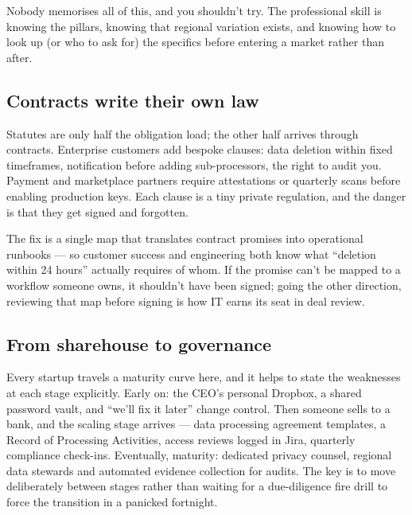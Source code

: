 Nobody memorises all of this, and you shouldn't try. The professional skill is knowing the pillars, knowing that regional variation exists, and knowing how to look up (or who to ask for) the specifics before entering a market rather than after.



\subsection{Contracts write their own law}


Statutes are only half the obligation load; the other half arrives through contracts. Enterprise customers add bespoke clauses: data deletion within fixed timeframes, notification before adding sub-processors, the right to audit you. Payment and marketplace partners require attestations or quarterly scans before enabling production keys. Each clause is a tiny private regulation, and the danger is that they get signed and forgotten.


The fix is a single map that translates contract promises into operational runbooks — so customer success and engineering both know what ``deletion within 24 hours'' actually requires of whom. If the promise can't be mapped to a workflow someone owns, it shouldn't have been signed; going the other direction, reviewing that map before signing is how IT earns its seat in deal review.



\subsection{From sharehouse to governance}


Every startup travels a maturity curve here, and it helps to state the weaknesses at each stage explicitly. Early on: the CEO's personal Dropbox, a shared password vault, and ``we'll fix it later'' change control. Then someone sells to a bank, and the scaling stage arrives — data processing agreement templates, a Record of Processing Activities, access reviews logged in Jira, quarterly compliance check-ins. Eventually, maturity: dedicated privacy counsel, regional data stewards and automated evidence collection for audits. The key is to move deliberately between stages rather than waiting for a due-diligence fire drill to force the transition in a panicked fortnight.



